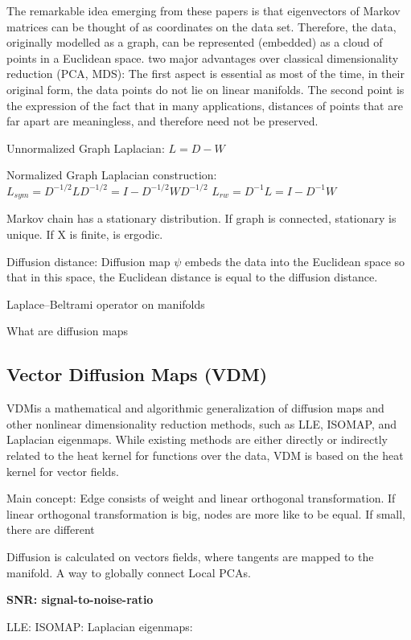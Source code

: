 The remarkable idea emerging from these papers is that eigenvectors of Markov matrices can be thought of as coordinates
on the data set. Therefore, the data, originally modelled as a graph, can be represented (embedded) as a cloud of points
in a Euclidean space.
two major advantages over classical dimensionality reduction (PCA, MDS):
The first aspect is essential as most of the time, in their original form, the data points do not lie on
 linear manifolds.
 The second point is the expression of the fact that in many
applications, distances of points that are far apart are meaningless, and therefore need not be preserved.

Unnormalized Graph Laplacian:
$L = D - W$

Normalized Graph Laplacian construction:
$L_{sym} = D^{-1/2}LD^{-1/2} = I - D^{-1/2}WD^{-1/2} $
$L_{rw} = D^{-1}L = I - D^{-1}W $

Markov chain has a stationary distribution.
If graph is connected, stationary is unique.
If X is finite,  is ergodic.

Diffusion distance:
Diffusion map $\psi$ embeds the data into the Euclidean space so that in this space, the Euclidean
distance is equal to the diffusion distance.

Laplace–Beltrami operator on manifolds

What are diffusion maps

\subsection{Vector Diffusion Maps (VDM)}

\cite{vectorDiffusionMaps}
VDMis a mathematical and algorithmic generalization of diffusion maps
and other nonlinear dimensionality reduction methods, such as LLE, ISOMAP,
and Laplacian eigenmaps. While existing methods are either directly or indirectly
related to the heat kernel for functions over the data, VDM is based on
the heat kernel for vector fields.

Main concept:
Edge consists of weight and linear orthogonal transformation.
If linear orthogonal transformation is big, nodes are more like to be equal.
If small, there are different

Diffusion is calculated on vectors fields, where tangents are mapped to the manifold.
A way to globally connect Local PCAs.

\textbf{SNR: signal-to-noise-ratio}


LLE:
ISOMAP:
Laplacian eigenmaps:


